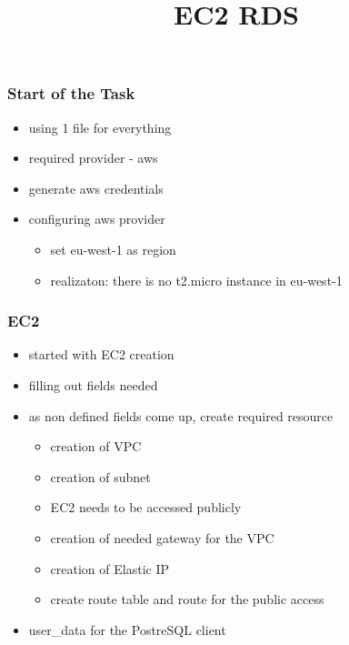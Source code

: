 \documentclass{beamer}
\title{EC2 RDS}
\begin{document}
\date{}
\frame{\titlepage}

	\begin{frame}
		\frametitle{Start of the Task}
		\begin{itemize}
		\item using 1 file for everything
		\item required provider - aws
		\item generate aws credentials
		\item configuring aws provider
			\begin{itemize}
				\item set eu-west-1 as region
				\item realizaton: there is no t2.micro instance in eu-west-1
			\end{itemize}
		\end{itemize}
	\end{frame}

	\begin{frame}
		\frametitle{EC2}	
		\begin{itemize}
			\item started with EC2 creation
			\item filling out fields needed
			\item as non defined fields come up, create required resource
			\begin{itemize}
				\item creation of VPC 
				\item creation of subnet
				\item EC2 needs to be accessed publicly
				\item creation of needed gateway for the VPC
				\item creation of Elastic IP
				\item create route table and route for the public access
			\end{itemize}
			\item user_data for the PostreSQL client
		\end{itemize}
	\end{frame}
	
\end{document}
